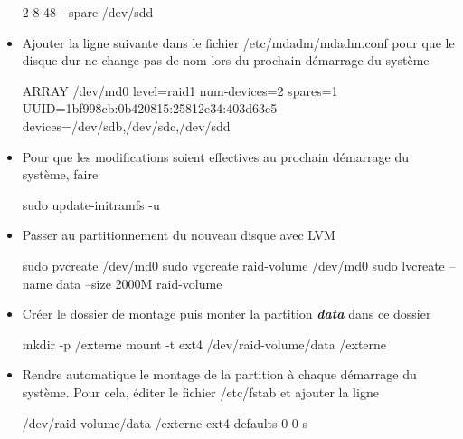 \documentclass[a4paper,12pt,french]{report} %
\begin{document}
\begin{itemize}
\begin{exempleConsole}
			   2       8       48        -      spare   /dev/sdd
		
	\end{exempleConsole}
	\item  Ajouter la ligne suivante dans le fichier /etc/mdadm/mdadm.conf pour que le disque dur ne change pas de nom lors du prochain démarrage du système 
	\begin{exempleConsole}
	ARRAY /dev/md0 level=raid1 num-devices=2 spares=1 UUID=1bf998cb:0b420815:25812e34:403d63c5 devices=/dev/sdb,/dev/sdc,/dev/sdd
	\end{exempleConsole}
	\item Pour que les modifications soient effectives au prochain démarrage du système, faire
	\begin{exempleConsole}
	sudo update-initramfs -u
	\end{exempleConsole}
	\item Passer au partitionnement du nouveau disque avec LVM
	\begin{exempleConsole}
	sudo pvcreate /dev/md0
	sudo vgcreate raid-volume /dev/md0 
	sudo lvcreate --name data --size 2000M raid-volume
	\end{exempleConsole}
	\item Créer le dossier de montage puis monter la partition \emph{\textbf{data}} dans ce dossier 
	\begin{exempleConsole}
	mkdir -p /externe
	mount -t ext4 /dev/raid-volume/data /externe
	\end{exempleConsole}
	\item Rendre automatique le montage de la partition à chaque démarrage du système. Pour cela, éditer le fichier /etc/fstab et ajouter la ligne
	\begin{exempleConsole}
	/dev/raid-volume/data /externe ext4 defaults 0 0
	s\end{exempleConsole}
\end{itemize} 
\end{document}
